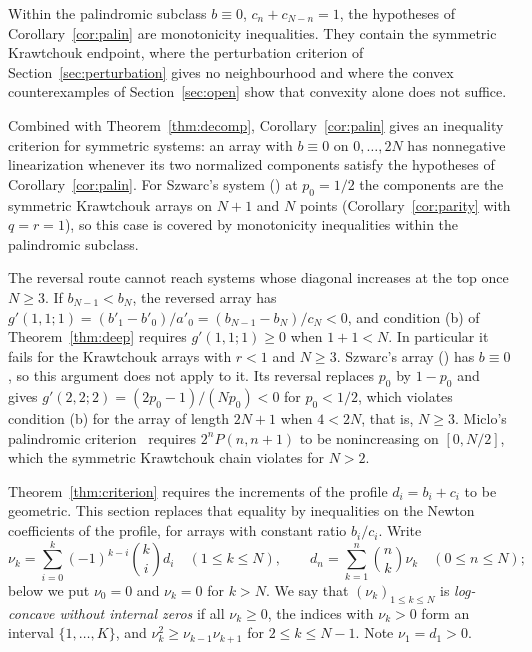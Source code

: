 \documentclass[twoside,10pt]{article}
\makeatletter
\numberwithin{equation}{section}
\theoremstyle{slbody}
\theoremstyle{definition}
\theoremstyle{remark}
\renewcommand{\section}{\@startsection{section}{1}{\z@}{-3.5ex \@plus -1ex \@minus -.2ex}{2.3ex \@plus .2ex}{\normalfont\large\bfseries}}
\renewcommand{\eqref}[1]{\textup{{\normalfont(\oldstylenums{\ref{#1}}}\normalfont)}}
\makeatother
\begin{document}
Within the palindromic subclass $b\equiv0$, $c_n+c_{N-n}=1$, the hypotheses of Corollary~\ref{cor:palin} are monotonicity inequalities. They contain the symmetric Krawtchouk endpoint, where the perturbation criterion of Section~\ref{sec:perturbation} gives no neighbourhood and where the convex counterexamples of Section~\ref{sec:open} show that convexity alone does not suffice.

Combined with Theorem~\ref{thm:decomp}, Corollary~\ref{cor:palin} gives an inequality criterion for symmetric systems: an array with $b\equiv0$ on $0,\ldots,2N$ has nonnegative linearization whenever its two normalized components satisfy the hypotheses of Corollary~\ref{cor:palin}. For Szwarc's system \eqref{eq:qarray} at $p_0=1/2$ the components are the symmetric Krawtchouk arrays on $N+1$ and $N$ points (Corollary~\ref{cor:parity} with $q=r=1$), so this case is covered by monotonicity inequalities within the palindromic subclass.

The reversal route cannot reach systems whose diagonal increases at the top once $N\geq3$. If $b_{N-1}<b_N$, the reversed array has $g'(1,1;1)=(b'_1-b'_0)/a'_0=(b_{N-1}-b_N)/c_N<0$, and condition (b) of Theorem~\ref{thm:deep} requires $g'(1,1;1)\geq0$ when $1+1<N$. In particular it fails for the Krawtchouk arrays with $r<1$ and $N\geq3$. Szwarc's array \eqref{eq:qarray} has $b\equiv0$, so this argument does not apply to it. Its reversal replaces $p_0$ by $1-p_0$ and gives $g'(2,2;2)=(2p_0-1)/(Np_0)<0$ for $p_0<1/2$, which violates condition (b) for the array of length $2N+1$ when $4<2N$, that is, $N\geq3$. Miclo's palindromic criterion~\cite[Theorem~31]{miclo2015} requires $2^nP(n,n+1)$ to be nonincreasing on $[0,N/2]$, which the symmetric Krawtchouk chain violates for $N>2$.

\section{Log-concave profiles}\label{sec:lc}

Theorem~\ref{thm:criterion} requires the increments of the profile $d_i=b_i+c_i$ to be geometric. This section replaces that equality by inequalities on the Newton coefficients of the profile, for arrays with constant ratio $b_i/c_i$. Write
\[
\nu_k=\sum_{i=0}^k(-1)^{k-i}\binom ki d_i\quad(1\leq k\leq N),\qquad d_n=\sum_{k=1}^n\binom nk\nu_k\quad(0\leq n\leq N);
\]
below we put $\nu_0=0$ and $\nu_k=0$ for $k>N$.
We say that $(\nu_k)_{1\leq k\leq N}$ is \emph{log-concave without internal zeros} if all $\nu_k\geq0$, the indices with $\nu_k>0$ form an interval $\{1,\ldots,K\}$, and $\nu_k^2\geq\nu_{k-1}\nu_{k+1}$ for $2\leq k\leq N-1$. Note $\nu_1=d_1>0$.
\end{document}
